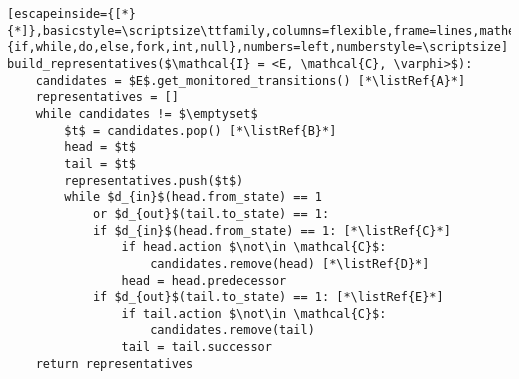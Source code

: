 \renewcommand{\ttdefault}{pcr}
\begin{lstlisting}[escapeinside={[*}{*]},basicstyle=\scriptsize\ttfamily,columns=flexible,frame=lines,mathescape=true,xleftmargin=3.0ex,keywordstyle=\textbf,morekeywords={if,while,do,else,fork,int,null},numbers=left,numberstyle=\scriptsize]
build_representatives($\mathcal{I} = <E, \mathcal{C}, \varphi>$):
	candidates = $E$.get_monitored_transitions() [*\listRef{A}*]
	representatives = []
	while candidates != $\emptyset$
		$t$ = candidates.pop() [*\listRef{B}*]
		head = $t$
		tail = $t$
		representatives.push($t$)
		while $d_{in}$(head.from_state) == 1 
			or $d_{out}$(tail.to_state) == 1:
			if $d_{in}$(head.from_state) == 1: [*\listRef{C}*]
				if head.action $\not\in \mathcal{C}$:
					candidates.remove(head) [*\listRef{D}*]
				head = head.predecessor
			if $d_{out}$(tail.to_state) == 1: [*\listRef{E}*]
				if tail.action $\not\in \mathcal{C}$:
					candidates.remove(tail)
				tail = tail.successor
	return representatives
\end{lstlisting}